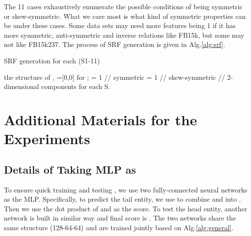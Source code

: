\documentclass[conference]{IEEEtran}
\begin{document}
The 11 cases exhaustively enumerate the possible conditions of  being symmetric or skew-symmetric.
What we care most is what kind of symmetric properties  can be under these cases.
Some data sets may need more features being 1 if it has more symmetric, anti-symmetric and inverse relations like FB15k,
but some may not like FB15k237.
The process of SRF generation is given in Alg.\ref{alg:srf}.



\begin{algorithm}[ht]
\caption{SRF generation for each (S1-11)}
\label{alg:srf}
\small
\begin{algorithmic}[1]
	\REQUIRE the structure of , =[0,0] for ; 
	\IF {}
	\STATE [0] = 1 \quad // symmetric
	\ENDIF
	\IF{}
	\STATE [1] = 1 	\quad // skew-symmetric
	\ENDIF
	\ENDFOR
	\RETURN  \qquad // 2-dimensional components for each S.
\end{algorithmic}
\end{algorithm}

\section{Additional Materials for the Experiments}

\subsection{Details of Taking MLP as }
\label{app:mlp}

To ensure quick training and testing \cite{dettmers2017convolutional},
we use two fully-connected neural networks as the MLP.
Specifically, to predict the tail entity, we use  to combine  and  into .
Then we use the dot product of  and  as the score.
To test the head entity, another network  is built in similar way and final score is 
.
The two networks share the same structure (128-64-64) and are trained jointly based on Alg.\ref{alg:general}.
\end{document}

